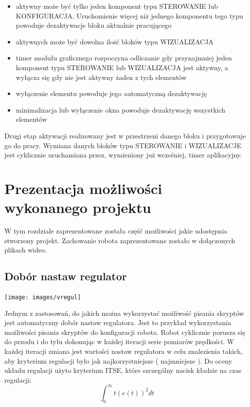\documentclass[eng,printmode]{mgr}
\begin{document}
\begin{itemize}
 \item aktywny może być tylko jeden komponent typu STEROWANIE lub KONFIGURACJA. Uruchomienie więcej niż jednego komponentu tego typu powoduje dezaktywacje bloku aktualnie pracującego
 \item aktywnych może być dowolna ilość bloków typu WIZUALIZACJA
 \item timer modułu graficznego rozpoczyna odliczanie gdy przynajmniej jeden komponent typu STEROWANIE lub WIZUALIZACJA jest aktywny, a wyłącza się gdy nie jest aktywny żaden z tych elementów
 \item wyłączenie elementu powoduje jego automatyczną dezaktywację
 \item minimalizacja lub wyłączenie okna powoduje dezaktywację wszystkich elementów
\end{itemize}
\newpage
Drugi etap aktywacji realizowany jest w przestrzeni danego bloku i przygotowuje go do pracy. Wymiana danych  bloków typu STEROWANIE  i WIZUALIZACJE jest  cyklicznie uruchamiana przez, wymieniony już wcześniej,  timer aplikacyjny.

  \chapter{Prezentacja możliwości wykonanego projektu}
W tym rozdziale zaprezentowane została część możliwości jakie udostępnia stworzony projekt. Zachowanie robota zaprezentowane zostało w dołączonych plikach wideo. 

 \section{Dobór nastaw regulator}

\begin{center}
  \texttt{[image: images/vregul]}
\end{center}

Jednym z zastosowań, do jakich można wykorzystać możliwość pisania skryptów jest automatyczny dobór nastaw regulatora. Jest to przykład wykorzystania możliwości pisania skryptów do konfiguracji robota. Robot cyklicznie porusza się do przodu i do tyłu dokonując w każdej iteracji serie pomiarów prędkości. W każdej iteracji zmiana jest wartości nastaw regulatora w celu znalezienia takich, aby kryterium regulacji było jak najkorzystniejsze ( najmniejsze ). Do oceny układu regulacji użyto kryterium ITSE, które szczególny nacisk kładzie na czas regulacji:
\begin{equation}\label{eq:aproksymacja}
   \int_{0}^{\infty}t\left (e(t) \right )^{2}dt
  \end{equation}
\end{document}
